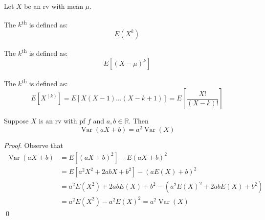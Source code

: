 \documentclass[notoc,notitlepage]{tufte-book}
\DeclareMathOperator{\Var}{Var }
\begin{document}
\begin{defn}[Moments]
\label{defn:moments}
  Let $X$ be an rv with mean $\mu$.

  The $k$\textsuperscript{th}  is defined as:
  \begin{equation*}
    E(X^k)
  \end{equation*}

  The $k$\textsuperscript{th}  is defined as:
  \begin{equation*}
    E[ (X - \mu)^k ]
  \end{equation*}

  The $k$\textsuperscript{th}  is defined as:
  \begin{equation*}
    E[ X^{(k)} ] = E [ X (X - 1) \hdots (X - k + 1) ] = E \left[ \frac{X!}{(X - k)!} \right]
  \end{equation*}
\end{defn}

\begin{thm}
\label{thm:variance_of_a_linear_function}
  Suppose $X$ is an rv with pf $f$ and $a, b \in \mathbb{R}$. Then
  \begin{equation*}
    \Var(aX + b) = a^2 \Var(X)
  \end{equation*}
\end{thm}

\begin{proof}
  Observe that
  \begin{align*}
    \Var(aX + b) &= E[ (aX + b)^2 ] - E(aX + b)^2 \\
                 &= E[ a^2 X^2 + 2abX + b^2 ] - (aE(X) + b)^2 \\
                 &= a^2 E(X^2) + 2abE(X) + b^2 - (a^2 E(X)^2 + 2abE(X) + b^2) \\
                 &= a^2 E(X^2) - a^2 E(X)^2 = a^2 \Var(X)
  \end{align*}\qed
\end{proof}
\end{document}
